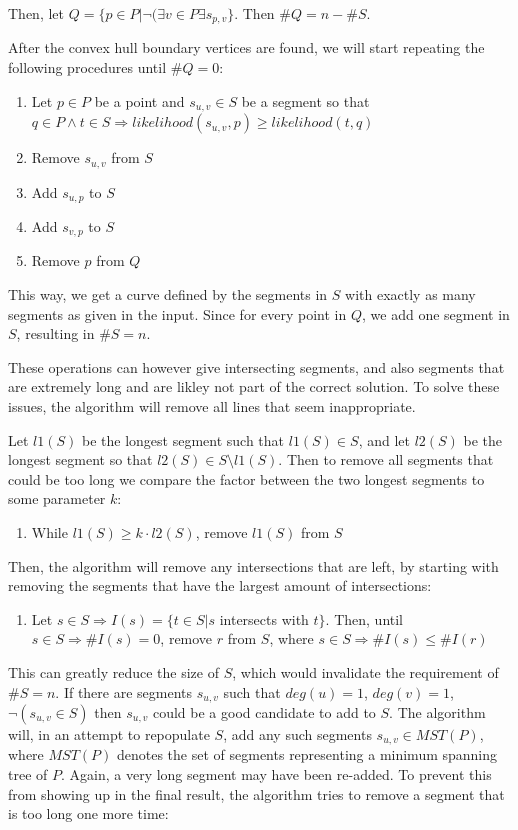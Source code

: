 \documentclass[11pt]{article}
\begin{document}
Then, let $Q = \{ p \in P | \neg ( \exists v \in P \exists s_{p,v} \}$. Then $\#Q = n - \#S$.

After the convex hull boundary vertices are found, we will start repeating the following procedures until $\#Q = 0$:

\begin{enumerate}
\item Let $p \in P$ be a point and $s_{u,v} \in S$ be a segment so that $q \in P \wedge t \in S \Rightarrow likelihood(s_{u,v}, p) \geq likelihood(t, q)$
\item Remove $s_{u,v}$ from $S$
\item Add $s_{u, p}$ to $S$
\item Add $s_{v, p}$ to $S$
\item Remove $p$ from $Q$
\end{enumerate}

This way, we get a curve defined by the segments in $S$ with exactly as many segments as given in the input. Since for every point in $Q$, we add one segment in $S$, resulting in $\#S = n$.

These operations can however give intersecting segments, and also segments that are extremely long and are likley not part of the correct solution. To solve these issues, the algorithm will remove all lines that seem inappropriate.

Let $l1(S)$ be the longest segment such that $l1(S) \in S$, and let $l2(S)$ be the longest segment so that $l2(S) \in S \setminus { l1(S) }$. Then to remove all segments that could be too long we compare the factor between the two longest segments to some parameter $k$:

\begin{enumerate}
\item While $l1(S) \geq k \cdot l2(S)$, remove $l1(S)$ from $S$
\end{enumerate}

Then, the algorithm will remove any intersections that are left, by starting with removing the segments that have the largest amount of intersections:

\begin{enumerate}
\item Let $s \in S \Rightarrow I(s) = \{ t \in S | s$ intersects with $t \}$. Then, until $s \in S \Rightarrow \#I(s) = 0$, remove $r$ from $S$, where $s \in S \Rightarrow \#I(s) \leq \#I(r)$
\end{enumerate}

This can greatly reduce the size of $S$, which would invalidate the requirement of $\#S=n$. If there are segments $s_{u,v}$ such that $deg(u) = 1$, $deg(v) = 1$, $\neg ( s_{u,v} \in S )$ then $s_{u,v}$ could be a good candidate to add to $S$. The algorithm will, in an attempt to repopulate $S$, add any such segments $s_{u,v} \in MST(P) $, where $MST(P)$ denotes the set of segments representing a minimum spanning tree of $P$. Again, a very long segment may have been re-added. To prevent this from showing up in the final result, the algorithm tries to remove a segment that is too long one more time:
\end{document}
